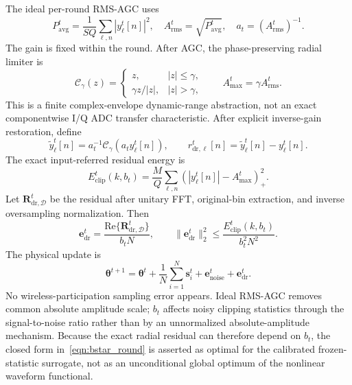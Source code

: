 \documentclass[journal]{IEEEtran}
\newenvironment{revisionblock}{\begingroup\color{revisionred}}{\endgroup}
\begin{document}
\begin{revisionblock}
The ideal per-round RMS-AGC uses
\begin{equation}
 P_{\mathrm{avg}}^t=\frac1{SQ}\sum_{\ell,n}|y_\ell^t[n]|^2,
 \quad A_{\mathrm{rms}}^t=\sqrt{P_{\mathrm{avg}}^t},
 \quad a_t=(A_{\mathrm{rms}}^t)^{-1}.
\end{equation}
The gain is fixed within the round. After AGC, the phase-preserving radial limiter is
\begin{equation}
 \mathcal C_\gamma(z)=\begin{cases}z,&|z|\le\gamma,\\ \gamma z/|z|,&|z|>\gamma,\end{cases}
 \qquad A_{\max}^t=\gamma A_{\mathrm{rms}}^t.
 \label{eqn:dr_operator}
\end{equation}
This is a finite complex-envelope dynamic-range abstraction, not an exact componentwise I/Q ADC transfer characteristic. After explicit inverse-gain restoration, define
\begin{equation}
 \widetilde y_\ell^t[n]=a_t^{-1}\mathcal C_\gamma(a_ty_\ell^t[n]),
 \qquad r_{\mathrm{dr},\ell}^t[n]=\widetilde y_\ell^t[n]-y_\ell^t[n].
\end{equation}
The exact input-referred residual energy is
\begin{equation}
 E_{\mathrm{clip}}^t(k,b_t)=\frac{M}{Q}\sum_{\ell,n}
 (|y_\ell^t[n]|-A_{\max}^t)_+^2.
 \label{eqn:eclip_system}
\end{equation}
Let $\mathbf R_{\mathrm{dr},\mathcal D}^t$ be the residual after unitary FFT, original-bin extraction, and inverse oversampling normalization. Then
\begin{equation}
 \mathbf e_{\mathrm{dr}}^t=\frac{\mathrm{Re}\{\mathbf R_{\mathrm{dr},\mathcal D}^t\}}{b_tN},
 \qquad
 \|\mathbf e_{\mathrm{dr}}^t\|_2^2\le\frac{E_{\mathrm{clip}}^t(k,b_t)}{b_t^2N^2}.
 \label{eqn:edr_bound_system}
\end{equation}
The physical update is
\begin{equation}
 \boldsymbol\theta^{t+1}=\boldsymbol\theta^t+\frac1N\sum_{i=1}^{N}\mathbf s_i^t
 +\mathbf e_{\mathrm{noise}}^t+\mathbf e_{\mathrm{dr}}^t.
 \label{eqn:physical_update_system}
\end{equation}
No wireless-participation sampling error appears. Ideal RMS-AGC removes common absolute amplitude scale; $b_t$ affects noisy clipping statistics through the signal-to-noise ratio rather than by an unnormalized absolute-amplitude mechanism. Because the exact radial residual can therefore depend on $b_t$, the closed form in~\eqref{eqn:bstar_round} is asserted as optimal for the calibrated frozen-statistic surrogate, not as an unconditional global optimum of the nonlinear waveform functional.
\end{revisionblock}
\end{document}
